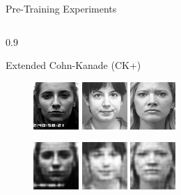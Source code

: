 \documentclass[final]{beamer}
\newlength{\onecolwid}
\newlength{\threecolwid}
\begin{document}
\begin{frame}[t]
\begin{columns}[t]
\begin{column}{\threecolwid}
\begin{alertblock}{Pre-Training Experiments}
\begin{columns}[t, totalwidth=0.9\threecolwid]
\begin{column}{0.9\onecolwid}
\begin{block}{Extended Cohn-Kanade (CK+)}
	\begin{figure}
	\centering
	\includegraphics[width=0.2\linewidth]{../graphics/reconstructions/ckplus/input_00.png}
	\includegraphics[width=0.2\linewidth]{../graphics/reconstructions/ckplus/input_01.png}
	\includegraphics[width=0.2\linewidth]{../graphics/reconstructions/ckplus/input_02.png}

	\includegraphics[width=0.2\linewidth]{../graphics/reconstructions/ckplus/reconstruction_00.png}
	\includegraphics[width=0.2\linewidth]{../graphics/reconstructions/ckplus/reconstruction_01.png}
	\includegraphics[width=0.2\linewidth]{../graphics/reconstructions/ckplus/reconstruction_02.png}


\end{figure}
\end{block}
\end{column}
\end{columns}
\end{alertblock}
\end{column}
\end{columns}
\end{frame}
\end{document}
